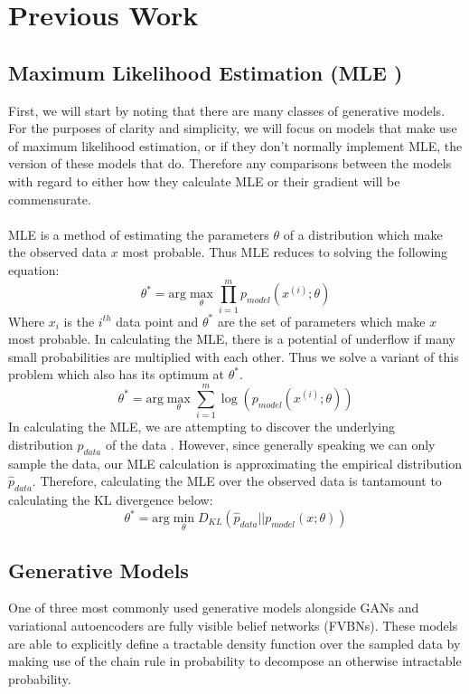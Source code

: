 \section{Previous Work}

\subsection{Maximum Likelihood Estimation (MLE )}
First, we will start by noting that there are many classes of generative models. For the purposes of clarity and simplicity, we will focus on models that make use of maximum likelihood estimation, or if they don't normally implement MLE, the version of these models that do. Therefore any comparisons between the models with regard to either how they calculate MLE or their gradient will be commensurate. \\ \\
MLE is a method of estimating the parameters $\theta$ of a distribution which make the observed data $x$ most probable. Thus MLE reduces to solving the following equation:
$$\theta^* = \text{arg}\max_\theta\prod_{i=1}^mp_{model}(x^{(i)};\theta)$$
Where $x_i$ is the $i^{th}$ data point and $\theta^*$ are the set of parameters which make $x$ most probable. In calculating the MLE, there is a potential of underflow if many small probabilities are multiplied with each other. Thus we solve a variant of this problem which also has its optimum at $\theta^*$.
$$\theta^* = \text{arg}\max_\theta\sum_{i=1}^m\log(p_{model}(x^{(i)};\theta))$$
In calculating the MLE, we are attempting to discover the underlying distribution $p_{data}$ of the data . However, since generally speaking we can only sample the data, our MLE calculation is approximating the empirical distribution $\hat{p}_{data}$. Therefore, calculating the MLE over the observed data is tantamount to calculating the KL divergence below: \cite{goodfellow2016nips}
$$\theta^* = \text{arg}\min_\theta D_{KL}(\hat{p}_{data} || p_{model}(x; \theta ))$$

\subsection{Generative Models}
One of three most commonly used generative models alongside GANs and variational autoencoders are fully visible belief networks (FVBNs). These models are able to explicitly define a tractable density function over the sampled data by making use of the chain rule in probability to decompose an otherwise intractable probability.

